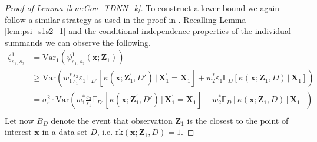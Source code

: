 \documentclass[letterpaper,10pt]{article}
\numberwithin{equation}{section}
\numberwithin{thm}{section}
\numberwithin{lem}{section}
\numberwithin{cor}{section}
\newcommand{\E}{\mathbb{E}}
\newcommand{\1}{\mathbbm{1}}
\newcommand{\Var}{\text{Var}}
\newcommand{\rk}{\text{rk}}
\begin{document}
\begin{proof}[Proof of Lemma \ref{lem:Cov_TDNN_k}]
	To construct a lower bound we again follow a similar strategy as used in the proof in \citet{demirkaya_optimal_2024}.
	Recalling Lemma \ref{lem:psi_s1s2_1} and the conditional independence properties of the individual summands we can observe the following.
	\begin{equation}
		\begin{aligned}
			\zeta_{s_1, s_2}^{1}
			 & = \Var_{1}(\psi_{s_1, s_2}^{1}\left(\mathbf{x}; \mathbf{Z}_1\right))                                                                                                               \\
			 & \geq \Var\left(w_{1}^{*}\frac{s_2}{s_1}\varepsilon_1 \E_{D'}\left[\kappa\left(\mathbf{x}; \mathbf{Z}_1^{\prime}, D'\right)\, \Big| \, \mathbf{X}_1^{\prime} = \mathbf{X}_1 \right]
			+ w_{2}^{*}\varepsilon_1 \E_D\left[\kappa\left(\mathbf{x}; \mathbf{Z}_1, D\right)\, \Big| \, \mathbf{X}_1\right]\right)                                                               \\
			 & = \sigma_{\varepsilon}^{2}\cdot
			\Var\left(w_{1}^{*}\frac{s_2}{s_1}\E_{D'}\left[\kappa\left(\mathbf{x}; \mathbf{Z}_1^{\prime}, D'\right)\, \Big| \, \mathbf{X}_1^{\prime} = \mathbf{X}_1 \right]
			+ w_{2}^{*}\E_D\left[\kappa\left(\mathbf{x}; \mathbf{Z}_1, D\right)\, \Big| \, \mathbf{X}_1\right]\right)                                                                             \\
		\end{aligned}
	\end{equation}
	Let now $B_D$ denote the event that observation $\mathbf{Z}_1$ is the closest to the point of interest $\mathbf{x}$ in a data set $D$, i.e. $\rk(\mathbf{x}; \mathbf{Z}_1, D) = 1$.

\end{proof}
\end{document}
